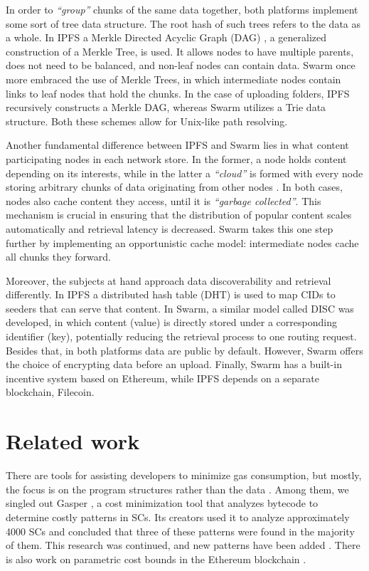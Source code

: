 In order to \emph{``group''} chunks of the same data together, both platforms implement some sort of tree data structure. The root hash of such trees refers to the data as a whole. In IPFS a Merkle Directed Acyclic Graph (DAG)  \citep{benet_2014}, a generalized construction of a Merkle Tree, is used. It allows nodes to have multiple parents, does not need to be balanced, and non-leaf nodes can contain data. Swarm once more embraced the use of Merkle Trees, in which intermediate nodes contain links to leaf nodes that hold the chunks. In the case of uploading folders, IPFS recursively constructs a Merkle DAG, whereas Swarm utilizes a Trie  \citep{tron_2020} data structure. Both these schemes allow for Unix-like path resolving.

Another fundamental difference between IPFS and Swarm lies in what content participating nodes in each network store. In the former, a node holds content depending on its interests, while in the latter a \emph{``cloud''} is formed with every node storing arbitrary chunks of data originating from other nodes \citep{swarmwiki_2019}. In both cases, nodes also cache content they access, until it is \emph{``garbage collected''}. This mechanism is crucial in ensuring that the distribution of popular content scales automatically and retrieval latency is decreased. Swarm takes this one step further by implementing an opportunistic cache model: intermediate nodes cache all chunks they forward.

Moreover, the subjects at hand approach data discoverability and retrieval differently. In IPFS a distributed hash table (DHT) \citep{benet_2014} is used to map CIDs to seeders that can serve that content. In Swarm, a similar model called DISC  \citep{tron_2020} was developed, in which content (value) is directly stored under a corresponding identifier (key), potentially reducing the retrieval process to one routing request. Besides that, in both platforms data are public by default. However, Swarm offers the choice of encrypting data before an upload. Finally, Swarm has a built-in incentive system based on Ethereum, while IPFS depends on a separate blockchain, Filecoin. 

\section{Related work}\label{sec:related_work}
There are tools for assisting developers to minimize gas consumption, but mostly, the focus is on the program structures rather than the data  \citep{nelaturu_2021, chen_2017, chen_2021}. Among them, we singled out Gasper  \citep{chen_2017}, a cost minimization tool that analyzes bytecode to determine costly patterns in SCs. Its creators used it to analyze approximately 4000 SCs and concluded that three of these patterns were found in the majority of them. This research was continued, and new patterns have been added  \citep{chen_2021}. There is also work on parametric cost bounds in the Ethereum blockchain \citep{albert_2021}.

